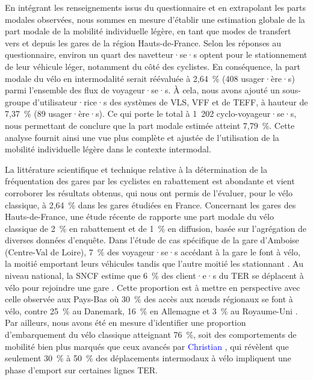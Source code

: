 \begin{refsegment}
En intégrant les renseignements issus du questionnaire et en extrapolant les parts modales observées, nous sommes en mesure d'établir une estimation globale de la part modale de la mobilité individuelle légère, en tant que modes de transfert vers et depuis les gares de la région Hauts-de-France. Selon les réponses au questionnaire, environ un quart des navetteur·se·s optent pour le stationnement de leur véhicule léger, notamment du côté des cyclistes. En conséquence, la part modale du vélo en \gls{intermodalité} serait réévaluée à 2,64~\% (408 usager·ère·s) parmi l'ensemble des flux de voyageur·se·s. À cela, nous avons ajouté un sous-groupe d'utilisateur·rice·s des systèmes de \acrfull{VLS}, \acrfull{VFF} et de \acrfull{TEFF}, à hauteur de 7,37~\% (89 usager·ère·s). Ce qui porte le total à 1~202 cyclo-voyageur·se·s, nous permettant de conclure que la part modale estimée atteint 7,79~\%. Cette analyse fournit ainsi une vue plus complète et ajustée de l'utilisation de la mobilité individuelle légère dans le contexte intermodal.%

La littérature scientifique et technique relative à la détermination de la fréquentation des gares par les cyclistes en rabattement est abondante et vient corroborer les résultats obtenus, qui nous ont permis de l'évaluer, pour le vélo classique, à 2,64~\% dans les gares étudiées en France. Concernant les gares des Hauts-de-France, une étude récente de \textcolor{blue}{\textcite[20]{hasiak_estimation_2023}} rapporte une part modale du vélo classique de 2~\% en \gls{rabattement} et de 1~\% en \gls{diffusion}, basée sur l'agrégation de diverses données d'enquête. Dans l'étude de cas spécifique de la gare d'Amboise (Centre-Val de Loire), 7~\% des voyageur·se·s accédant à la gare le font à vélo, la moitié emportant leurs véhicules tandis que l'autre moitié les stationnant \textcolor{blue}{\autocite[744]{midenet_modal_2018}}. Au niveau national, la SNCF estime que 6~\% des client·e·s du \acrshort{TER} se déplacent à vélo pour rejoindre une gare \textcolor{blue}{\autocite[9]{coue_embarq_2021}}. Cette proportion est à mettre en perspective avec celle observée aux Pays-Bas où 30~\% des accès aux nœuds régionaux se font à vélo, contre 25~\% au Danemark, 16~\% en Allemagne et 3~\% au Royaume-Uni \textcolor{blue}{\autocite[285]{martens_bicycle_2004}}. Par ailleurs, nous avons été en mesure d'identifier une proportion d'embarquement du vélo classique atteignant 76~\%, soit des comportements de mobilité bien plus marqués que ceux avancés par \textcolor{blue}{Christian} \textcolor{blue}{\textcite[5]{gioria_etude_2016}}, qui révèlent que seulement 30~\% à 50~\% des déplacements intermodaux à vélo impliquent une phase d'emport sur certaines lignes \acrshort{TER}.%


\end{refsegment}

